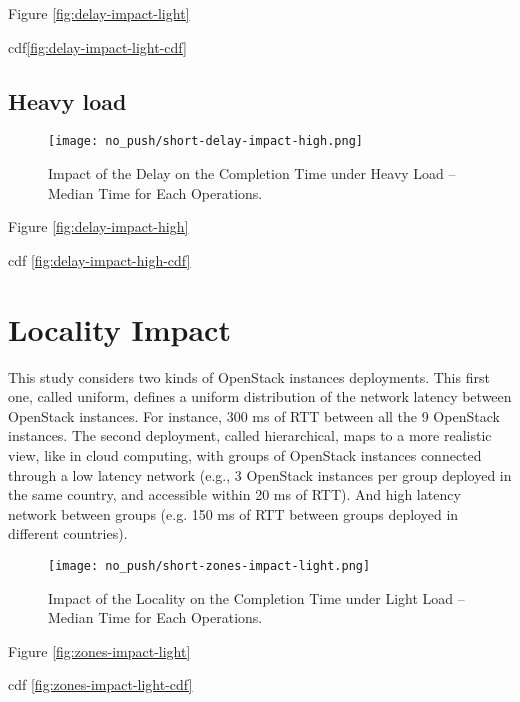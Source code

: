 Figure \ref{fig:delay-impact-light}

cdf\ref{fig:delay-impact-light-cdf}

\subsection{Heavy load}

\begin{figure}[H]
  \vspace{-10pt}
  \centering
  \centerline{\texttt{[image: no\_push/short-delay-impact-high.png]}}
  \vspace{-5pt}
  \caption{Impact of the Delay on the Completion Time under Heavy Load – Median Time for Each Operations.}
  \vspace{-5pt}
  \label{fig:short-delay-impact-high}
\end{figure}

Figure \ref{fig:delay-impact-high}

cdf \ref{fig:delay-impact-high-cdf}

\section{Locality Impact}

This study considers two kinds of OpenStack instances deployments. This first one, called uniform, defines a uniform distribution of the network latency between OpenStack instances. For instance, 300 ms of RTT between all the 9 OpenStack instances. The second deployment, called hierarchical, maps to a more realistic view, like in cloud computing, with groups of OpenStack instances connected through a low latency network (e.g., 3 OpenStack instances per group deployed in the same country, and accessible within 20 ms of RTT). And high latency network between groups (e.g. 150 ms of RTT between groups deployed in different countries).

\begin{figure}[H]
  \vspace{-10pt}
  \centering
  \centerline{\texttt{[image: no\_push/short-zones-impact-light.png]}}
  \vspace{-5pt}
  \caption{Impact of the Locality on the Completion Time under Light Load – Median Time for Each Operations.}
  \vspace{-5pt}
  \label{fig:short-zones-impact-light}
\end{figure}


Figure \ref{fig:zones-impact-light}

cdf \ref{fig:zones-impact-light-cdf}
